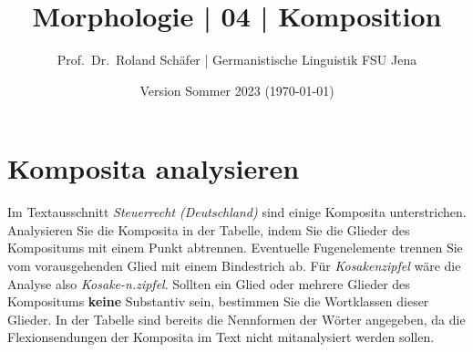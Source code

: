 \documentclass[12pt,a4paper,twoside]{article}
\author{Prof.\ Dr.\ Roland Schäfer | Germanistische Linguistik FSU Jena}
\title{Morphologie | 04 | Komposition}
\date{Version Sommer 2023 (\today)}
\newcommand{\Zeile}{\vspace{\baselineskip}}
\begin{document}
\maketitle

\section{Komposita analysieren}\label{sec:analyse}

Im Textausschnitt \textit{Steuerrecht (Deutschland)} sind einige Komposita unterstrichen.
Analysieren Sie die Komposita in der Tabelle, indem Sie die Glieder des Kompositums mit einem Punkt abtrennen.
Eventuelle Fugenelemente trennen Sie vom vorausgehenden Glied mit einem Bindestrich ab.
Für \textit{Kosakenzipfel} wäre die Analyse also \textit{Kosake-n.zipfel}.
Sollten ein Glied oder mehrere Glieder des Kompositums \textbf{keine} Substantiv sein, bestimmen Sie die Wortklassen dieser Glieder.
In der Tabelle sind bereits die Nennformen der Wörter angegeben, da die Flexionsendungen der Komposita im Text nicht mitanalysiert werden sollen.

\Zeile
\end{document}
